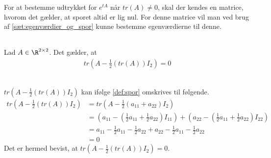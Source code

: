 For at bestemme udtrykket for $e^{tA}$ når $tr(A) \neq 0$, skal der kendes en matrice, hvorom det gælder, at sporet altid er lig nul. For denne matrice vil man ved brug af \autoref{sæt:egenværdier_og_spor} kunne bestemme egenværdierne til denne.

\begin{thmx}\textbf{}\label{sæt:tr(a-led)=0}\\
Lad $A\in \R^{2\times2}$. Det gælder, at 
\begin{align*}
    tr\left(A-\frac{1}{2}\left(tr\left(A\right)\right)I_2\right) = 0
\end{align*}
\end{thmx}

\begin{bev}\textbf{}\\
$tr\left(A-\frac{1}{2}\left(tr\left(A\right)\right)I_2\right)$ kan ifølge \autoref{def:spor} omskrives til følgende.
\begin{align*}
    tr\left(A-\frac{1}{2}\left(tr\left(A\right)\right)I_2\right) &= tr\left(A-\frac{1}{2}\left(a_{11}+a_{22}\right)I_2\right) \\
    &= \left(a_{11}-\left(\frac{1}{2}a_{11} + \frac{1}{2}a_{22}\right)I_{11}\right)+ \left(a_{22}-\left(\frac{1}{2}a_{11} + \frac{1}{2}a_{22}\right)I_{22}\right)\\
    &=a_{11}-\frac{1}{2}a_{11}-\frac{1}{2}a_{22}+a_{22}-\frac{1}{2}a_{11}-\frac{1}{2}a_{22}\\
    &=0
\end{align*}
Det er hermed bevist, at $tr\left(A-\frac{1}{2}\left(tr\left(A\right)\right)I_2\right) = 0$.
\end{bev}



